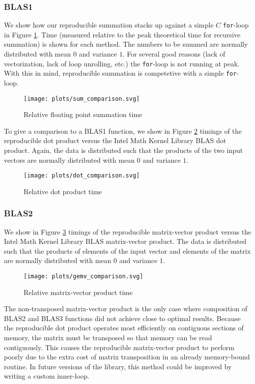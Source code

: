   \subsubsection{BLAS1}

    We show how our reproducible summation stacks up against a simple $C$ \texttt{for}-loop in Figure \ref{fig:forloop_timings}. Time (measured relative to the peak theoretical time for recursive summation) is shown for each method. The numbers to be summed are normally distributed with mean $0$ and variance $1$. For several good reasons (lack of vectorization, lack of loop unrolling, etc.) the \texttt{for}-loop is not running at peak. With this in mind, reproducible summation is competetive with a simple \texttt{for}-loop.
  \begin{figure}[H]
  \begin{center}
  \texttt{[image: plots/sum\_comparison.svg]}
  \caption{Relative floating point summation time}
  \label{fig:forloop_timings}
  \end{center}
  \end{figure}
    To give a comparison to a BLAS1 function, we show in Figure \ref{fig:dot_timings} timings of the reproducible dot product versus the Intel Math Kernel Library \cite{MKL} BLAS dot product. Again, the data is distributed such that the products of the two input vectors are normally distributed with mean $0$ and variance $1$.
  \begin{figure}[H]
  \begin{center}
  \texttt{[image: plots/dot\_comparison.svg]}
  \caption{Relative dot product time}
  \label{fig:dot_timings}
  \end{center}
  \end{figure}
  \subsubsection{BLAS2}
    We show in Figure \ref{fig:gemv_timings} timings of the reproducible matrix-vector product versus the Intel Math Kernel Library \cite{MKL} BLAS matrix-vector product. The data is distributed such that the products of elements of the input vector and elements of the matrix are normally distributed with mean $0$ and variance $1$.
  \begin{figure}[H]
  \begin{center}
  \texttt{[image: plots/gemv\_comparison.svg]}
  \caption{Relative matrix-vector product time}
  \label{fig:gemv_timings}
  \end{center}
  \end{figure}
  The non-transposed matrix-vector product is the only case where composition of BLAS2 and BLAS3 functions did not achieve close to optimal results. Because the reproducible dot product operates most efficiently on contiguous sections of memory, the matrix must be transposed so that memory can be read contiguously. This causes the reproducible matrix-vector product to perform poorly due to the extra cost of matrix transposition in an already memory-bound routine. In future versions of the library, this method could be improved by writing a custom inner-loop.

